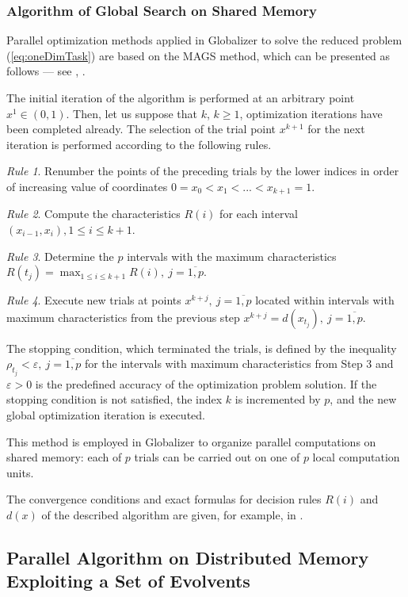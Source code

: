 \documentclass{svproc}
\begin{document}
\subsubsection{Algorithm of Global Search on Shared Memory}
\label{sub:ags}
Parallel optimization methods applied in Globalizer to solve the reduced problem
(\ref{eq:oneDimTask}) are based on the MAGS method, which can be presented as follows ---
see \cite{strongin1978}, \cite{strSergGO}.
\par
The initial iteration of the algorithm is performed at an arbitrary point \mbox{\(x^1\in(0,1)\)}.
Then, let us suppose that \(k\), \(k\ge 1\), optimization iterations have been completed already.
The selection of the trial point \(x^{k+1}\) for the next iteration is performed according to the
following rules.

\textit{Rule 1}. Renumber the points of the preceding trials by the lower indices in order of
increasing value of coordinates
$0=x_0<x_1<...<x_{k+1}=1$.

\textit{Rule 2}. Compute the characteristics \(R(i)\) for each interval \((x_{i-1},x_i),1\leq i\leq
k+1\).

\textit{Rule 3}. Determine the \(p\) intervals with the maximum characteristics $R(t_j)=\max_{1\leq i
\leq k+1}R(i),\: j=\overline{1,p}$.

\textit{Rule 4}. Execute new trials at points \(x^{k+j},\: j=\overline{1,p}\) located within intervals
with
maximum characteristics from the previous step
  $x^{k+j}=d(x_{t_j}),\: j=\overline{1,p}$.

The stopping condition, which terminated the trials, is defined by the inequality
$\rho_{t_j}<\varepsilon,\: j=\overline{1,p}$
for the intervals with maximum characteristics from Step 3 and \(\varepsilon >0\) is the
predefined accuracy of the optimization problem solution. If the stopping condition is not satisfied,
the index \(k\) is incremented by \(p\), and the new global optimization iteration is executed.

This method is employed in Globalizer to organize parallel computations on shared memory: each of
\(p\)
trials can be carried out on one of \(p\) local computation units.

The convergence conditions and exact formulas for decision rules $R(i)$ and $d(x)$ of the
described algorithm are given, for example, in \cite{strSergGO}.

\subsection{Parallel Algorithm on Distributed Memory Exploiting a Set of Evolvents}
\label{sub:parallel_evolvents}
\end{document}
